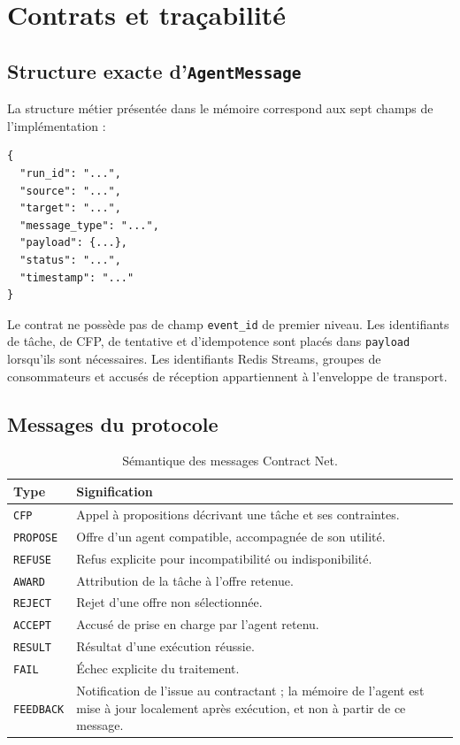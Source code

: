 \appendix
\chapter{Contrats et traçabilité}

\section{Structure exacte d’\texttt{AgentMessage}}

La structure métier présentée dans le mémoire correspond aux sept champs de l’implémentation :

\begin{verbatim}
{
  "run_id": "...",
  "source": "...",
  "target": "...",
  "message_type": "...",
  "payload": {...},
  "status": "...",
  "timestamp": "..."
}
\end{verbatim}

Le contrat ne possède pas de champ \texttt{event\_id} de premier niveau. Les identifiants de tâche, de CFP, de tentative et d’idempotence sont placés dans \texttt{payload} lorsqu’ils sont nécessaires. Les identifiants Redis Streams, groupes de consommateurs et accusés de réception appartiennent à l’enveloppe de transport.

\section{Messages du protocole}

\begin{table}[H]
\centering
\caption{Sémantique des messages Contract Net.}
\label{tab:messages-cnp-annexe}
\begin{tabularx}{\textwidth}{p{} X}
\toprule
\textbf{Type} & \textbf{Signification} \\
\midrule
\texttt{CFP} & Appel à propositions décrivant une tâche et ses contraintes. \\
\texttt{PROPOSE} & Offre d’un agent compatible, accompagnée de son utilité. \\
\texttt{REFUSE} & Refus explicite pour incompatibilité ou indisponibilité. \\
\texttt{AWARD} & Attribution de la tâche à l’offre retenue. \\
\texttt{REJECT} & Rejet d’une offre non sélectionnée. \\
\texttt{ACCEPT} & Accusé de prise en charge par l’agent retenu. \\
\texttt{RESULT} & Résultat d’une exécution réussie. \\
\texttt{FAIL} & Échec explicite du traitement. \\
\texttt{FEEDBACK} & Notification de l’issue au contractant ; la mémoire de l’agent est mise à jour localement après exécution, et non à partir de ce message. \\
\bottomrule
\end{tabularx}
\end{table}

